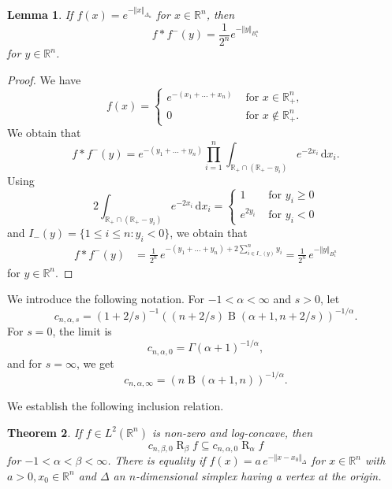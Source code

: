\documentclass{amsart}
\newtheorem{theorem}{Theorem}
\newtheorem{lemma}[theorem]{Lemma}
\newcommand{\omr}[1]{\operatorname{R}_{#1}\!}
\newcommand{\R}{\mathbb R}
\newcommand{\Beta}{\operatorname{B}}
\renewcommand{\d}{\,\mathrm{d}}
\newcommand{\mn}[1]{#1_{\scriptscriptstyle -}}
\begin{document}
\begin{lemma} \label{lem_calc}
If $f(x)=e^{-\Vert x\Vert_{\Delta_n}}$ for $x\in\R^n$, then 
\[
    f*f^-(y)= \frac1{2^n}e^{- \Vert y\Vert_{B_1^n}}
\]
for $y\in\R^n$.
\end{lemma}

\begin{proof}
We have
\[
f(x)= \begin{cases}
e^{-(x_1+\dots+x_n)} &\text{ for } x\in \R^n_+,\\
0&\text{ for } x\not\in \R^n_+.
\end{cases}
\]
We obtain that
\begin{equation}
f*f^-(y)= e^{-(y_1+\dots+y_n)}\prod_{i=1}^n\int_{\R_+\cap (\R_+-y_i)} e^{-2 x_i}\d x_i.
\end{equation}
Using 
\begin{equation}
2\int_{\R_+\cap (\R_+-y_i)} e^{-2 x_i}\d x_i = 
\begin{cases}
1 &\text{ for } y_i\ge0\\
e^{2y_i} &\text{ for } y_i<0
\end{cases}
\end{equation}
and $\mn{I}(y)=\{1\le i\le n: y_i<0\}$,
we obtain that
\begin{align}
f*f^-(y) &= \frac1{2^n} \,e^{-(y_1+\dots+y_n) +2\sum_{i\in \mn{I}(y)}^n y_i}= \frac1{2^n}\, e^{- \Vert y\Vert_{B_1^n}}
\end{align}
for $y\in\R^n$.
\end{proof}

\goodbreak

We introduce the following notation. For $-1 < \alpha < \infty$ and $s>0$, let
\[
c_{n,\alpha,s} = (1+2/s)^{-1} ((n+2/s) \Beta(\alpha+1, n+2/s))^{-1/\alpha}.
\]
For $s=0$, the limit is
\[
c_{n,\alpha,0} = \Gamma(\alpha+1)^{-1/\alpha},
\]
and for $s = \infty$, we get
\[
c_{n,\alpha,\infty} = (n \Beta(\alpha+1, n))^{-1/\alpha}.
\]


We establish the following inclusion relation.

\begin{theorem}\label{thm_inclusion}
If  $f\in L^2(\R^n)$ is non-zero and log-concave, then 
\[
c_{n,\beta,0} \omr \beta f
\subseteq  c_{n,\alpha,0} \omr \alpha f
\]
for $-1<\alpha<\beta<\infty$.
There is equality if $f(x)=a\,e^{-\Vert x - x_0\Vert_\Delta}$ for $x\in\R^n$ with $a>0, x_0 \in \R^n$ and $\Delta$ an $n$-dimensional simplex having a vertex at the origin.
\end{theorem}
\end{document}

